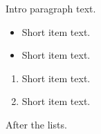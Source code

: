 \documentclass[12pt]{article}
\begin{document}
Intro paragraph text.

\begin{itemize}
\item Short item text.
\item Short item text.
\end{itemize}

\begin{enumerate}
\item Short item text.
\item Short item text.
\end{enumerate}

After the lists.
\end{document}
